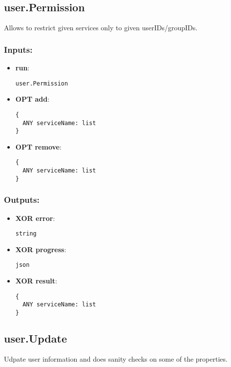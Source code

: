 \subsection{user.Permission}
\label{ch:builtinservices:user.Permission}
Allows to restrict given services only to given userIDs/groupIDs.
\subsubsection*{Inputs:}
\begin{itemize}
  \small
    \item \textbf{run}: 
\begin{lstlisting}
user.Permission
\end{lstlisting}
    \item \textbf{OPT add}: 
\begin{lstlisting}
{
  ANY serviceName: list
}
\end{lstlisting}
    \item \textbf{OPT remove}: 
\begin{lstlisting}
{
  ANY serviceName: list
}
\end{lstlisting}
  \end{itemize}
\subsubsection*{Outputs:}
\begin{itemize}
  \small
    \item \textbf{XOR error}: 
\begin{lstlisting}
string
\end{lstlisting}
    \item \textbf{XOR progress}: 
\begin{lstlisting}
json
\end{lstlisting}
    \item \textbf{XOR result}: 
\begin{lstlisting}
{
  ANY serviceName: list
}
\end{lstlisting}
  \end{itemize}

\subsection{user.Update}
\label{ch:builtinservices:user.Update}
Udpate user information and does sanity checks on some of the properties.
